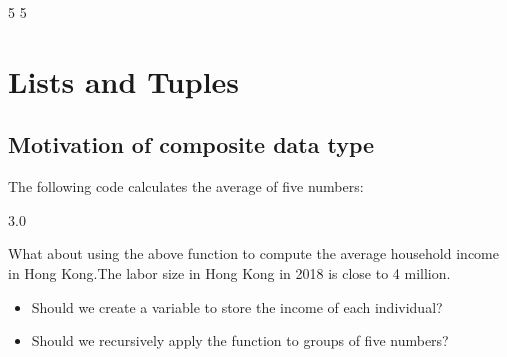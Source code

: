 \documentclass[letterpaper,10pt,english]{sphinxmanual}
\begin{document}
\begin{sphinxVerbatim}[commandchars=\\\{\}]
5
5
\end{sphinxVerbatim}


\chapter{Lists and Tuples}
\label{\detokenize{Lecture7/Lists and Tuples:lists-and-tuples}}\label{\detokenize{Lecture7/Lists and Tuples::doc}}

\section{Motivation of composite data type}
\label{\detokenize{Lecture7/Lists and Tuples:motivation-of-composite-data-type}}
The following code calculates the average of five numbers:

\begin{sphinxVerbatim}[commandchars=\\\{\}]
     
               


    
\end{sphinxVerbatim}

\begin{sphinxVerbatim}[commandchars=\\\{\}]
3.0
\end{sphinxVerbatim}

What about using the above function to compute the average household income in Hong Kong.The labor size in Hong Kong in 2018 is close to 4 million.
\begin{itemize}
\item {} 
Should we create a variable to store the income of each individual?

\item {} 
Should we recursively apply the function to groups of five numbers?

\end{itemize}
\end{document}
